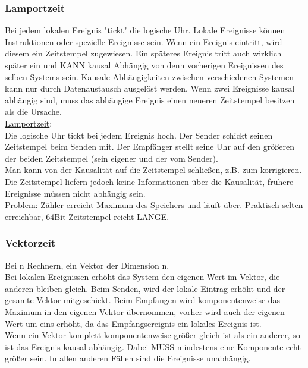 \documentclass[a4paper]{article}
\begin{document}
\subsubsection{Lamportzeit}
Bei jedem lokalen Ereignis "tickt" die logische Uhr. Lokale Ereignisse können Instruktionen oder spezielle Ereignisse sein. Wenn ein Ereignis eintritt, wird diesem ein Zeitstempel zugewiesen. Ein späteres Ereignis tritt auch wirklich später ein und KANN kausal Abhängig von denn vorherigen Ereignissen des selben Systems sein. Kausale Abhängigkeiten zwischen verschiedenen Systemen kann nur durch Datenaustausch ausgelöst werden. Wenn zwei Ereignisse kausal abhängig sind, muss das abhängige Ereignis einen neueren Zeitstempel besitzen als die Ursache.\\
\underline{Lamportzeit}:\\
Die logische Uhr tickt bei jedem Ereignis hoch. Der Sender schickt seinen Zeitstempel beim Senden mit. Der Empfänger stellt seine Uhr auf den größeren der beiden Zeitstempel (sein eigener und der vom Sender). \\
Man kann von der Kausalität auf die Zeitstempel schließen, z.B. zum korrigieren. Die Zeitstempel liefern jedoch keine Informationen über die Kausalität, frühere Ereignisse müssen nicht abhängig sein.\\
Problem: Zähler erreicht Maximum des Speichers und läuft über. Praktisch selten erreichbar, 64Bit Zeitstempel reicht LANGE.\\
\subsubsection{Vektorzeit}
Bei n Rechnern, ein Vektor der Dimension n.\\
Bei lokalen Ereignissen erhöht das System den eigenen Wert im Vektor, die anderen bleiben gleich. Beim Senden, wird der lokale Eintrag erhöht und der gesamte Vektor mitgeschickt. Beim Empfangen wird komponentenweise das Maximum in den eigenen Vektor übernommen, vorher wird auch der eigenen Wert um eins erhöht, da das Empfangsereignis ein lokales Ereignis ist.\\
Wenn ein Vektor komplett komponentenweise größer gleich ist als ein anderer, so ist das Ereignis kausal abhängig. Dabei MUSS mindestens eine Komponente echt größer sein. In allen anderen Fällen sind die Ereignisse unabhängig.\\
\end{document}
